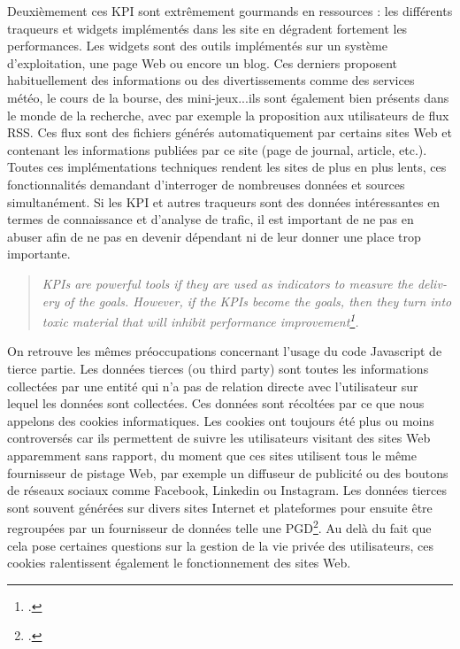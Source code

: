 \documentclass[a4paper,12pt,twoside]{book}
\begin{document}
Deuxièmement ces \acrshort{KPI} sont extrêmement gourmands en ressources : les différents traqueurs et widgets implémentés dans les site en dégradent fortement les performances. Les widgets sont des outils implémentés sur un système d'exploitation, une page Web ou encore un blog. Ces derniers proposent habituellement des informations ou des divertissements comme des services météo, le cours de la bourse, des mini-jeux...ils sont également bien présents dans le monde de la recherche, avec par exemple la proposition aux utilisateurs de flux RSS. Ces flux sont des fichiers générés automatiquement par certains sites Web et contenant les informations publiées par ce site (page de journal, article, etc.). Toutes ces implémentations techniques rendent les sites de plus en plus lents, ces fonctionnalités demandant d'interroger de nombreuses données et sources simultanément.
Si les \acrshort{KPI} et autres traqueurs sont des données intéressantes en termes de connaissance et d'analyse de trafic, il est important de ne pas en abuser afin de ne pas en devenir dépendant ni de leur donner une place trop importante. 
\begin{otherlanguage}{english}
\begin{quote}
    \textit{KPIs are powerful tools if they are used as indicators to measure the delivery of the goals. However, if the KPIs become the goals, then they turn into toxic material that will inhibit performance improvement\footcite{marr_caution_2021}.}
\end{quote}
\end{otherlanguage}


On retrouve les mêmes préoccupations concernant l'usage du code Javascript de tierce partie. Les données tierces (ou third party) sont toutes les informations collectées par une entité qui n'a pas de relation directe avec l'utilisateur sur lequel les données sont collectées. Ces données sont récoltées par ce que nous appelons des \og cookies \fg{} informatiques. Les cookies ont toujours été plus ou moins controversés car ils permettent de suivre les utilisateurs visitant des sites Web apparemment sans rapport, du moment que ces sites utilisent tous le même fournisseur de pistage Web, par exemple un diffuseur de publicité ou des boutons de réseaux sociaux comme Facebook, Linkedin ou Instagram. Les données tierces sont souvent générées sur divers sites Internet et plateformes pour ensuite être regroupées par un fournisseur de données telle une \acrfull{PGD}\footcite{third_party}. Au delà du fait que cela pose certaines questions sur la gestion de la vie privée des utilisateurs, ces cookies ralentissent également le fonctionnement des sites Web.
\end{document}
